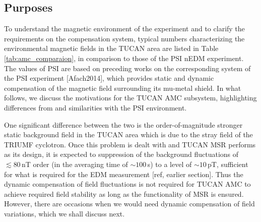 



\subsection{Purposes}

To understand the magnetic environment of the experiment and to clarify the requirements on the compensation system, typical numbers characterizing the environmental magnetic fields in the TUCAN area are listed in Table \ref{tab:amc_comparaion}, in comparison to those of the PSI nEDM experiment.
The values of PSI are based on preceding works on the corresponding system of the PSI experiment [Afach2014], which provides static and dynamic compensation of the magnetic field surrounding its mu-metal shield. In what follows, we discuss the motivations for the TUCAN AMC subsystem, highlighting differences from and similarities with the PSI environment.

One significant difference between the two is the order-of-magnitude stronger static background field in the TUCAN area which is due to the stray field of the TRIUMF cyclotron. Once this problem is dealt with and TUCAN MSR performs as its design, it is expected to suppression of the background fluctuations of $\lesssim 80\,$nT order (in the averaging time of $\sim 100\,$s) to a level of $\sim10\,$pT, sufficient for what is required for the EDM measurement [ref, earlier section]. Thus the dynamic compensation of field fluctuations is not required for TUCAN AMC to achieve required field stability as long as the functionality of MSR is ensured. However, there are occasions when we would need dynamic compensation of field variations, which we shall discuss next. 

